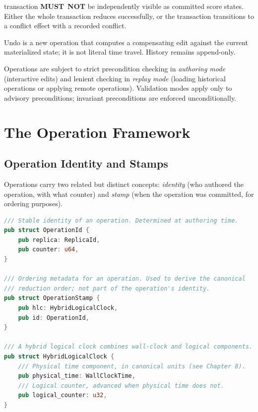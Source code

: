 \documentclass[11pt,letterpaper]{report}
\newcommand{\MUSTNOT}{\textbf{MUST}\nobreak\ \textbf{NOT}}
\begin{document}
\begin{description}
    transaction \MUSTNOT{} be independently visible as committed
    score states. Either the whole transaction reduces successfully,
    or the transaction transitions to a conflict effect with a
    recorded conflict.
  \item[Undo is forward, not backward.] Undo is a new operation that
    computes a compensating edit against the current materialized
    state; it is not literal time travel. History remains
    append-only.
  \item[Two validation modes for advisory checking.] Operations are
    subject to strict precondition checking in \emph{authoring mode}
    (interactive edits) and lenient checking in \emph{replay mode}
    (loading historical operations or applying remote operations).
    Validation modes apply only to advisory preconditions;
    invariant preconditions are enforced unconditionally.
\end{description}

\section{The Operation Framework}
\label{sec:semops:framework}

\subsection{Operation Identity and Stamps}

Operations carry two related but distinct concepts: \emph{identity}
(who authored the operation, with what counter) and \emph{stamp}
(when the operation was committed, for ordering purposes).

\begin{lstlisting}[language=Rust]
/// Stable identity of an operation. Determined at authoring time.
pub struct OperationId {
    pub replica: ReplicaId,
    pub counter: u64,
}

/// Ordering metadata for an operation. Used to derive the canonical
/// reduction order; not part of the operation's identity.
pub struct OperationStamp {
    pub hlc: HybridLogicalClock,
    pub id: OperationId,
}

/// A hybrid logical clock combines wall-clock and logical components.
pub struct HybridLogicalClock {
    /// Physical time component, in canonical units (see Chapter 8).
    pub physical_time: WallClockTime,
    /// Logical counter, advanced when physical time does not.
    pub logical_counter: u32,
}
\end{lstlisting}
\end{document}
